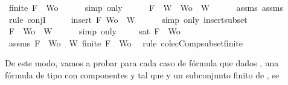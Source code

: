 \begin{isabellebody}
\ {\isachardoublequoteopen}finite\ {\isacharparenleft}{\isacharbraceleft}F{\isacharbraceright}\ {\isasymunion}\ Wo{\isacharparenright}{\isachardoublequoteclose}\isanewline
\ \ \ \ \isamarkupfalse%
\ {\isacharparenleft}simp\ only{\isacharcolon}\ {}{\isacharparenright}\ \isanewline
\ \ \isamarkupfalse%
\ {\isachardoublequoteopen}F\ {\isasymin}\ W\ {\isasymand}\ Wo\ {\isasymsubseteq}\ W{\isachardoublequoteclose}\isanewline
\ \ \ \ \isamarkupfalse%
\ assms{\isacharparenleft}{}{\isacharparenright}\ assms{\isacharparenleft}{}{\isacharparenright}\ \isamarkupfalse%
\ {\isacharparenleft}rule\ conjI{\isacharparenright}\isanewline
\ \ \isamarkupfalse%
\ \isamarkupfalse%
\ {\isachardoublequoteopen}insert\ F\ Wo\ {\isasymsubseteq}\ W{\isachardoublequoteclose}\isanewline
\ \ \ \ \isamarkupfalse%
\ {\isacharparenleft}simp\ only{\isacharcolon}\ insert{\isacharunderscore}subset{\isacharparenright}\isanewline
\ \ \isamarkupfalse%
\ \isamarkupfalse%
\ {\isachardoublequoteopen}{\isacharbraceleft}F{\isacharbraceright}\ {\isasymunion}\ Wo\ {\isasymsubseteq}\ W{\isachardoublequoteclose}\isanewline
\ \ \ \ \isamarkupfalse%
\ {\isacharparenleft}simp\ only{\isacharcolon}\ {}{\isacharparenright}\isanewline
\ \ \isamarkupfalse%
\ {\isachardoublequoteopen}sat\ {\isacharparenleft}{\isacharbraceleft}F{\isacharbraceright}\ {\isasymunion}\ Wo{\isacharparenright}{\isachardoublequoteclose}\isanewline
\ \ \ \ \isamarkupfalse%
\ assms{\isacharparenleft}{}{\isacharparenright}\ {\isacartoucheopen}{\isacharbraceleft}F{\isacharbraceright}\ {\isasymunion}\ Wo\ {\isasymsubseteq}\ W{\isacartoucheclose}\ {\isacartoucheopen}finite\ {\isacharparenleft}{\isacharbraceleft}F{\isacharbraceright}\ {\isasymunion}\ Wo{\isacharparenright}{\isacartoucheclose}\ \isamarkupfalse%
\ {\isacharparenleft}rule\ colecComp{\isacharunderscore}subset{\isacharunderscore}finite{\isacharparenright}\isanewline
{}\isamarkupfalse%
%
\endisatagproof
{\isafoldproof}%
%
\isadelimproof
%
\endisadelimproof
%
\begin{isamarkuptext}%
De este modo, vamos a probar para cada caso de fórmula \isa{{\isasymalpha}} que dados ,  una fórmula 
  de tipo \isa{{\isasymalpha}} con componentes  y  tal que  y  un subconjunto finito de , se 

\end{isamarkuptext}
\end{isabellebody}
